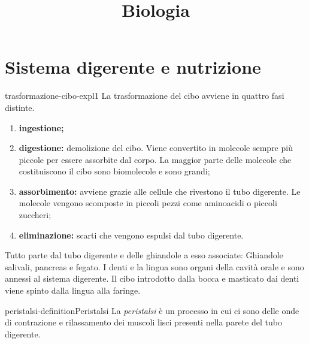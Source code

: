 \documentclass[preview]{standalone}
\begin{document}
\title{Biologia}
\genpage

\section{Sistema digerente e nutrizione}

\begin{snippet}{trasformazione-cibo-expl1}
    La trasformazione del cibo avviene in quattro fasi distinte.
    \begin{enumerate}
        \item \textbf{ingestione;}
        \item \textbf{digestione:} demolizione del cibo. Viene convertito in molecole sempre più piccole per essere
        assorbite dal corpo. La maggior parte delle molecole che costituiscono il cibo sono
        biomolecole e sono grandi;
        \item \textbf{assorbimento:} avviene grazie alle cellule che rivestono il tubo digerente.
        Le molecole vengono scomposte in piccoli pezzi come aminoacidi o piccoli zuccheri;
        \item \textbf{eliminazione:} scarti che vengono
        espulsi dal tubo digerente.
    \end{enumerate}

    Tutto parte dal tubo digerente e delle ghiandole a esso associate:
    Ghiandole salivali, pancreas e fegato. I denti e la lingua sono organi
    della cavità orale e sono annessi al sistema digerente.
    Il cibo introdotto dalla bocca e masticato dai denti viene spinto dalla
    lingua alla faringe.
\end{snippet}

\begin{snippetdefinition}{peristalsi-definition}{Peristalsi}
    La \textit{peristalsi} è un processo in cui ci sono delle onde di
    contrazione e rilassamento dei muscoli lisci presenti nella
    parete del tubo digerente.
\end{snippetdefinition}
\end{document}

